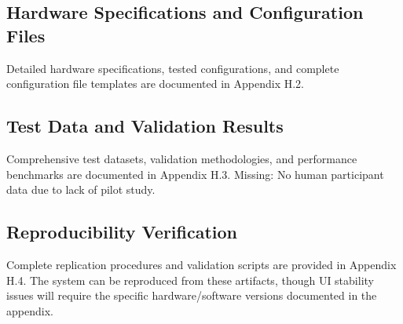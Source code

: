 \subsection{Hardware Specifications and Configuration Files}
Detailed hardware specifications, tested configurations, and complete configuration file templates are documented in Appendix H.2.

\subsection{Test Data and Validation Results}
Comprehensive test datasets, validation methodologies, and performance benchmarks are documented in Appendix H.3. Missing: No human participant data due to lack of pilot study.

\subsection{Reproducibility Verification}
Complete replication procedures and validation scripts are provided in Appendix H.4. The system can be reproduced from these artifacts, though UI stability issues will require the specific hardware/software versions documented in the appendix.

